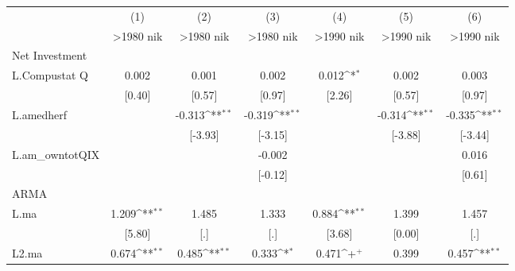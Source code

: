 {
\def\sym#1{\ifmmode^{#1}\else\(^{#1}\)\fi}
\begin{tabular}{l*{6}{c}}
\hline\hline
                    &\multicolumn{1}{c}{(1)}&\multicolumn{1}{c}{(2)}&\multicolumn{1}{c}{(3)}&\multicolumn{1}{c}{(4)}&\multicolumn{1}{c}{(5)}&\multicolumn{1}{c}{(6)}\\
                    &\multicolumn{1}{c}{>1980 nik}&\multicolumn{1}{c}{>1980 nik}&\multicolumn{1}{c}{>1980 nik}&\multicolumn{1}{c}{>1990 nik}&\multicolumn{1}{c}{>1990 nik}&\multicolumn{1}{c}{>1990 nik}\\
\hline
Net Investment      &                    &                    &                    &                    &                    &                    \\
L.Compustat Q       &       0.002        &       0.001        &       0.002        &       0.012\sym{*} &       0.002        &       0.003        \\
                    &      [0.40]        &      [0.57]        &      [0.97]        &      [2.26]        &      [0.57]        &      [0.97]        \\
L.amedherf          &                    &      -0.313\sym{**}&      -0.319\sym{**}&                    &      -0.314\sym{**}&      -0.335\sym{**}\\
                    &                    &     [-3.93]        &     [-3.15]        &                    &     [-3.88]        &     [-3.44]        \\
L.am\_owntotQIX      &                    &                    &      -0.002        &                    &                    &       0.016        \\
                    &                    &                    &     [-0.12]        &                    &                    &      [0.61]        \\
\hline
ARMA                &                    &                    &                    &                    &                    &                    \\
L.ma                &       1.209\sym{**}&       1.485        &       1.333        &       0.884\sym{**}&       1.399        &       1.457        \\
                    &      [5.80]        &         [.]        &         [.]        &      [3.68]        &      [0.00]        &         [.]        \\
L2.ma               &       0.674\sym{**}&       0.485\sym{**}&       0.333\sym{*} &       0.471\sym{+} &       0.399        &       0.457\sym{**}\\

\end{tabular}}
